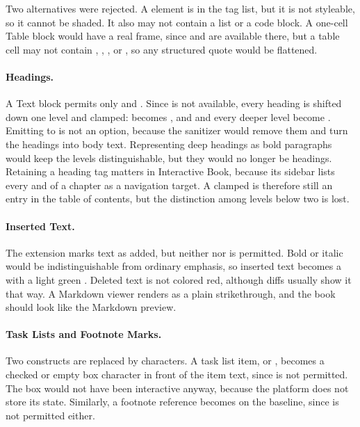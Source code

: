 Two alternatives were rejected.
A  element is in the tag list, but it is not styleable, so it cannot be shaded. It also may
not contain a list or a code block.
A one-cell Table block would have a real frame, since  and  are available
there, but a table cell may not contain , , , or , so any
structured quote would be flattened.

\paragraph{Headings.}
A Text block permits only  and .
Since  is not available, every heading is shifted down one level and clamped:
\code{\#} becomes , and \code{\#\#} and every deeper level become
.
Emitting  to  is not an option, because the sanitizer would remove them and turn
the headings into body text.
Representing deep headings as bold paragraphs would keep the levels distinguishable, but they would no longer be
headings.
Retaining a heading tag matters in Interactive Book, because its sidebar lists every  and  of a
chapter as a navigation target.
A clamped  is therefore still an entry in the table of contents, but the distinction among levels below two is lost.

\paragraph{Inserted Text.}
The  extension marks text as added, but neither  nor  is
permitted.
Bold or italic would be indistinguishable from ordinary emphasis, so inserted text becomes a
 with a light green .
Deleted text is not colored red, although diffs usually show it that way.
A Markdown viewer renders 
as a plain strikethrough, and the book should look like the Markdown preview.

\paragraph{Task Lists and Footnote Marks.}
Two constructs are replaced by characters.
A task list item, \code{- [x]} or \code{- [ ]}, becomes a checked or empty box character in front of
the item text, since  is not permitted.
The box would not have been interactive anyway, because the platform does not store its state.
Similarly, a footnote reference becomes \code{[1]} on the baseline, since  is not permitted either.

